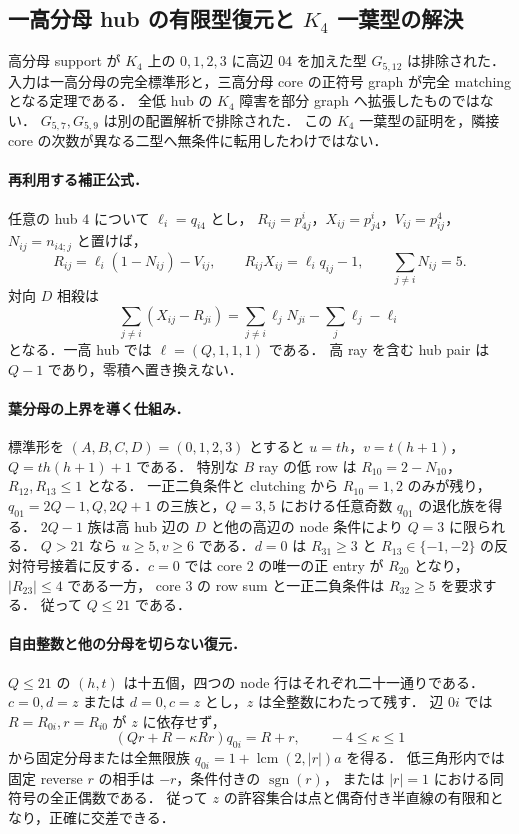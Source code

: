 \subsection{一高分母 hub の有限型復元と \texorpdfstring{$K_4$}{K4} 一葉型の解決}
\label{nl18:leaf-hub}

高分母 support が $K_4$ 上の $0,1,2,3$ に高辺 $04$ を加えた型 $G_{5,12}$ は排除された．
入力は一高分母の完全標準形と，三高分母 core の正符号 graph が完全 matching となる定理である．
全低 hub の $K_4$ 障害を部分 graph へ拡張したものではない．
$G_{5,7},G_{5,9}$ は別の配置解析で排除された．
この $K_4$ 一葉型の証明を，隣接 core の次数が異なる二型へ無条件に転用したわけではない．

\paragraph{再利用する補正公式．}
任意の hub $4$ について $\ell_i=q_{i4}$ とし，
$R_{ij}=p^i_{4j}$，$X_{ij}=p^i_{j4}$，$V_{ij}=p^4_{ij}$，$N_{ij}=n_{i4;j}$ と置けば，
\[
 R_{ij}=\ell_i(1-N_{ij})-V_{ij},\qquad
 R_{ij}X_{ij}=\ell_iq_{ij}-1,\qquad
 \sum_{j\ne i}N_{ij}=5.
\]
対向 $D$ 相殺は
\[
 \sum_{j\ne i}(X_{ij}-R_{ji})
 =\sum_{j\ne i}\ell_jN_{ji}-\sum_j\ell_j-\ell_i
\]
となる．一高 hub では $\ell=(Q,1,1,1)$ である．
高 ray を含む hub pair は $Q-1$ であり，零積へ置き換えない．

\paragraph{葉分母の上界を導く仕組み．}
標準形を $(A,B,C,D)=(0,1,2,3)$ とすると
$u=th$，$v=t(h+1)$，$Q=th(h+1)+1$ である．
特別な $B$ ray の低 row は $R_{10}=2-N_{10}$，$R_{12},R_{13}\le1$ となる．
一正二負条件と clutching から $R_{10}=1,2$ のみが残り，
$q_{01}=2Q-1,Q,2Q+1$ の三族と，$Q=3,5$ における任意奇数 $q_{01}$ の退化族を得る．
$2Q-1$ 族は高 hub 辺の $D$ と他の高辺の node 条件により $Q=3$ に限られる．
$Q>21$ なら $u\ge5,v\ge6$ である．$d=0$ は $R_{31}\ge3$ と
$R_{13}\in\{-1,-2\}$ の反対符号接着に反する．$c=0$ では
core $2$ の唯一の正 entry が $R_{20}$ となり，$|R_{23}|\le4$ である一方，
core $3$ の row sum と一正二負条件は $R_{32}\ge5$ を要求する．
従って $Q\le21$ である．

\paragraph{自由整数と他の分母を切らない復元．}
$Q\le21$ の $(h,t)$ は十五個，四つの node 行はそれぞれ二十一通りである．
$c=0,d=z$ または $d=0,c=z$ とし，$z$ は全整数にわたって残す．
辺 $0i$ では $R=R_{0i},r=R_{i0}$ が $z$ に依存せず，
\[
 (Qr+R-\kappa Rr)q_{0i}=R+r,\qquad -4\le\kappa\le1
\]
から固定分母または全無限族 $q_{0i}=1+\operatorname{lcm}(2,|r|)a$ を得る．
低三角形内では固定 reverse $r$ の相手は $-r$，条件付きの $\operatorname{sgn}(r)$，
または $|r|=1$ における同符号の全正偶数である．
従って $z$ の許容集合は点と偶奇付き半直線の有限和となり，正確に交差できる．

